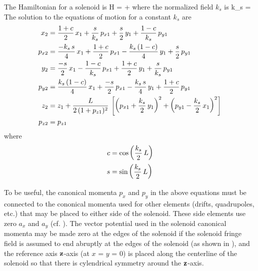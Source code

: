 The Hamiltonian for a solenoid is
\Begineq
  H =  + 
\Endeq
where the normalized field $k_s$ is
\Begineq
  k_s = 
\Endeq
The solution to the equations of motion for a constant $k_s$ are
\begin{align}
  x_2    &= \frac{1 + c}{2} \, x_1 + \frac{s}{k_s} \, p_{x1} +
           \frac{s}{2} \, y_1 + \frac{1 - c}{k_s} \, p_{y1} \nonumber \\
  p_{x2} &= \frac{-k_s \, s}{4} \, x_1 + \frac{1 + c}{2} \, p_{x1} - 
           \frac{k_s \, (1 - c)}{4} \, y_1 + \frac{s}{2} \, p_{y1} \nonumber \\
  y_2    &= \frac{-s}{2} \, x_1 - \frac{1 - c}{k_s} \, p_{x1} +
           \frac{1 + c}{2} \, y_1 + \frac{s}{k_s} \, p_{y1} \\      
  p_{y2} &= \frac{k_s \, (1 - c)}{4} \, x_1 + \frac{-s}{2} \, p_{x1} -
            \frac{k_s \, s}{4} \, y_1 + \frac{1 + c}{2} \, p_{y1} \nonumber \\ 
  z_2    &= z_1 + \frac{L}{2 \, (1 + p_{z1})^2} \, 
                   \left[ \left( p_{x1} + \frac{k_s}{2} \, y_1 \right)^2 +
                          \left( p_{y1} - \frac{k_s}{2} \, x_1 \right)^2 \right] \nonumber \\
  p_{z2} &= p_{z1} \nonumber
\end{align}
where
\begin{align}
  c &= \cos \left( \frac{k_s}{2} \, L \right) \nonumber \\
  s &= \sin \left( \frac{k_s}{2} \, L \right)
\end{align}

To be useful, the canonical momenta $p_x$ and $p_y$ in the above
equations must be connected to the cononical momenta used for other
elements (drifts, quadrupoles, etc.) that may be placed to either side
of the solenoid. These side elements use zero $a_x$ and $a_y$
(cf. ). The vector potential used in the solenoid canonical
momenta may be made zero at the edges of the solenoid if the solenoid
fringe field is assumed to end abruptly at the edges of the solenoid
(as shown in ), and the reference axis ${\bf z}$-axis (at
$x$ = $y$ = 0) is placed along the centerline of the solenoid so that
there is cylendrical symmetry around the ${\bf z}$-axis.
